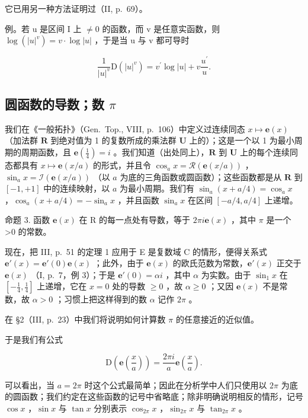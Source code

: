 它已用另一种方法证明过（II, p.~69）。

例。若 u 是区间 I 上 \(\neq 0\) 的函数，而 v 是任意实函数，则 \(\log(|u|^{v}) = v \cdot \log |u|\) ，于是当 u 与 v 都可导时

\[
\frac {1}{| u | ^ {v}} \mathrm{D} (| u | ^ {v}) = v ^ {\prime} \log | u | + v \frac {u ^ {\prime}}{u}.
\]

\subsection{\texorpdfstring{圆函数的导数；数 \(\pi\)}{圆函数的导数；数 π}}

我们在《一般拓扑》（Gen.~Top., VIII, p.~106）中定义过连续同态 \(x \mapsto \mathbf{e}(x)\) （加法群 \(\mathbf{R}\) 到绝对值为 1 的复数所成的乘法群 \(\mathbf{U}\) 上的）；这是一个以 1 为最小周期的周期函数，且 \(\mathbf{e}\left(\frac{1}{4}\right) = i\) 。我们知道（出处同上），\(\mathbf{R}\) 到 \(\mathbf{U}\) 上的每个连续同态都具有 \(x \mapsto \mathbf{e}(x / a)\) 的形式，并且令 \(\cos_a x = \mathcal{R}(\mathbf{e}(x / a))\) ，\(\sin_a x = \mathcal{I}(\mathbf{e}(x / a))\) （以 \(a\) 为底的三角函数或圆函数）；这些函数都是从 \(\mathbf{R}\) 到 \([-1, +1]\) 中的连续映射，以 \(a\) 为最小周期。我们有 \(\sin_a(x + a / 4) = \cos_a x\) ，\(\cos_a(x + a / 4) = -\sin_a x\) ，并且函数 \(\sin_a x\) 在区间 \([-a / 4, a / 4]\) 上递增。

命题 3. 函数 \(\mathbf{e}(x)\) 在 R 的每一点处有导数，等于 \(2\pi i\mathbf{e}(x)\) ，其中 \(\pi\) 是一个 \textgreater0 的常数。

现在，把 III, p.~51 的定理 1 应用于 E 是复数域 C 的情形，便得关系式 \(\mathbf{e}'(x) = \mathbf{e}'(0)\mathbf{e}(x)\) ；此外，由于 \(\mathbf{e}(x)\) 的欧氏范数为常数，\(\mathbf{e}'(x)\) 正交于 \(\mathbf{e}(x)\) （I, p.~7，例 3）；于是 \(\mathbf{e}'(0) = \alpha i\) ，其中 \(\alpha\) 为实数。由于 \(\sin_1 x\) 在 \([- \frac{1}{4}, \frac{1}{4}]\) 上递增，它在 \(x = 0\) 处的导数 \(\geqslant 0\) ，故 \(\alpha \geqslant 0\) ；又因 \(\mathbf{e}(x)\) 不是常数，故 \(\alpha > 0\) ；习惯上把这样得到的数 \(\alpha\) 记作 \(2\pi\) 。

在 §2（III, p.~23）中我们将说明如何计算数 \(\pi\) 的任意接近的近似值。

于是我们有公式

\[
\mathrm{D} \left(\mathbf {e} \left(\frac {x}{a}\right)\right) = \frac {2 \pi i}{a} \mathbf {e} \left(\frac {x}{a}\right).\tag{12}
\]

可以看出，当 \(a = 2\pi\) 时这个公式最简单；因此在分析学中人们只使用以 \(2\pi\) 为底的圆函数；我们约定在这些函数的记号中省略底；除非明确说明相反的情形，记号 \(\cos x\) ，\(\sin x\) 与 \(\tan x\) 分别表示 \(\cos_{2\pi}x\) ，\(\sin_{2\pi}x\) 与 \(\tan_{2\pi}x\) 。

